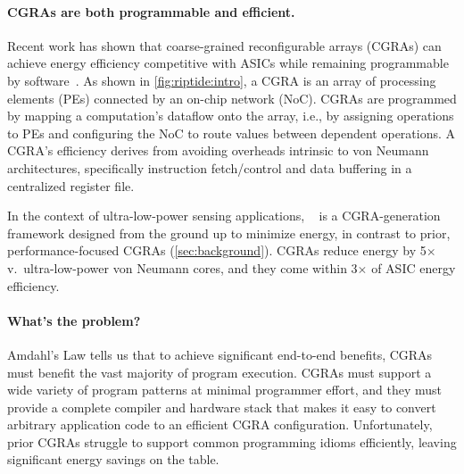 \paragraph{CGRAs are both programmable and efficient.}
%
Recent work has shown that coarse-grained reconfigurable
arrays (CGRAs) can achieve energy efficiency competitive with ASICs
while remaining programmable by software~\cite{snafu,nowatzki2017domain,weng2020dsagen}.
%
As shown in \autoref{fig:riptide:intro},
a CGRA
 is an array of processing elements
(PEs) connected by an on-chip network (NoC).
%
CGRAs are programmed by mapping a computation's dataflow
onto the array, i.e., by assigning operations to PEs and configuring
the NoC to route values between dependent operations.
%
A CGRA's efficiency derives from avoiding overheads intrinsic to von
Neumann architectures, specifically instruction fetch/control and data
buffering in a centralized register file.

In the context of ultra-low-power sensing applications,
\snafu~\cite{snafu} is a CGRA-generation framework designed from
the ground up to minimize energy, in contrast to prior,
performance-focused CGRAs (\autoref{sec:background}).
%
\snafu CGRAs reduce energy by 5$\times$ v.\ ultra-low-power von Neumann
cores, and they come within 3$\times$ of ASIC energy efficiency.

%

\paragraph{What's the problem?}
%
Amdahl's Law tells us that to achieve significant end-to-end benefits,
CGRAs must benefit the vast majority of program execution.
%
CGRAs must support a wide variety of program patterns at minimal programmer effort,
% 
and they must provide a complete compiler and hardware stack that makes it easy to convert arbitrary application code to an efficient CGRA configuration.
%
Unfortunately, prior CGRAs struggle to support common programming
idioms efficiently, leaving significant energy savings on the table.

